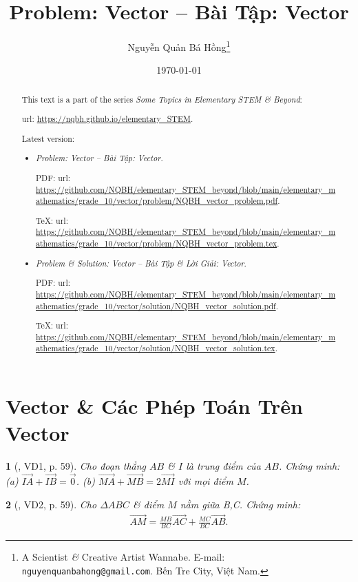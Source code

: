 \documentclass{article}
\title{Problem: Vector -- Bài Tập: Vector}
\author{Nguyễn Quản Bá Hồng\footnote{A Scientist {\it\&} Creative Artist Wannabe. E-mail: {\tt nguyenquanbahong@gmail.com}. Bến Tre City, Việt Nam.}}
\date{\today}
\newtheorem{baitoan}{}
\begin{document}
\maketitle
\begin{abstract}
	This text is a part of the series {\it Some Topics in Elementary STEM \& Beyond}:
	
	{\sc url}: \url{https://nqbh.github.io/elementary_STEM}.
	
	Latest version:
	\begin{itemize}
		\item {\it Problem: Vector -- Bài Tập: Vector}.
		
		PDF: {\sc url}: \url{https://github.com/NQBH/elementary_STEM_beyond/blob/main/elementary_mathematics/grade_10/vector/problem/NQBH_vector_problem.pdf}.
		
		\TeX: {\sc url}: \url{https://github.com/NQBH/elementary_STEM_beyond/blob/main/elementary_mathematics/grade_10/vector/problem/NQBH_vector_problem.tex}.
		\item {\it Problem \& Solution: Vector -- Bài Tập \& Lời Giải: Vector}.
		
		PDF: {\sc url}: \url{https://github.com/NQBH/elementary_STEM_beyond/blob/main/elementary_mathematics/grade_10/vector/solution/NQBH_vector_solution.pdf}.
		
		\TeX: {\sc url}: \url{https://github.com/NQBH/elementary_STEM_beyond/blob/main/elementary_mathematics/grade_10/vector/solution/NQBH_vector_solution.tex}.
	\end{itemize}
\end{abstract}
\tableofcontents


\section{Vector \& Các Phép Toán Trên Vector}

\begin{baitoan}[\cite{Hai_Hung_Thu_Tung2022_tap_1}, VD1, p. 59]
	Cho đoạn thẳng $AB$ \& $I$ là trung điểm của $AB$. Chứng minh: (a) $\overrightarrow{IA} + \overrightarrow{IB} = \vec{0}$. (b)  $\overrightarrow{MA} + \overrightarrow{MB} = 2\overrightarrow{MI}$ với mọi điểm $M$.
\end{baitoan}

\begin{baitoan}[\cite{Hai_Hung_Thu_Tung2022_tap_1}, VD2, p. 59]
	Cho $\Delta ABC$ \& điểm $M$ nằm giữa B,C. Chứng minh:
	\begin{align*}
		\overrightarrow{AM} = \frac{MB}{BC}\overrightarrow{AC} + \frac{MC}{BC}\overrightarrow{AB}.
	\end{align*}
\end{baitoan}
\end{document}
